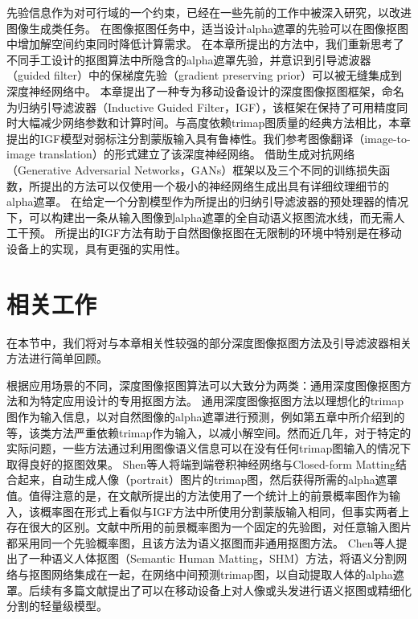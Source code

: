 先验信息作为对可行域的一个约束，已经在一些先前的工作中被深入研究，以改进图像生成类任务\cite{ulyanov2018deep}。
在图像抠图任务中，适当设计alpha遮罩的先验可以在图像抠图中增加解空间约束同时降低计算需求。
在本章所提出的方法中，我们重新思考了不同手工设计的抠图算法中所隐含的alpha遮罩先验，并意识到引导滤波器（guided filter）\cite{he2010guided}中的保梯度先验（gradient preserving prior）可以被无缝集成到深度神经网络中。
本章提出了一种专为移动设备设计的深度图像抠图框架，命名为归纳引导滤波器（Inductive Guided Filter，IGF），该框架在保持了可用精度同时大幅减少网络参数和计算时间。与高度依赖trimap图质量的经典方法相比，本章提出的IGF模型对弱标注分割蒙版输入具有鲁棒性。我们参考图像翻译（image-to-image translation）的形式建立了该深度神经网络。
借助生成对抗网络（Generative Adversarial Networks，GANs）框架以及三个不同的训练损失函数，所提出的方法可以仅使用一个极小的神经网络生成出具有详细纹理细节的alpha遮罩。
在给定一个分割模型作为所提出的归纳引导滤波器的预处理器的情况下，可以构建出一条从输入图像到alpha遮罩的全自动语义抠图流水线，而无需人工干预。
所提出的IGF方法有助于自然图像抠图在无限制的环境中特别是在移动设备上的实现，具有更强的实用性。

\section{相关工作}
在本节中，我们将对与本章相关性较强的部分深度图像抠图方法及引导滤波器相关方法进行简单回顾。

根据应用场景的不同，深度图像抠图算法可以大致分为两类：通用深度图像抠图方法和为特定应用设计的专用抠图方法。
通用深度图像抠图方法以理想化的trimap图作为输入信息，以对自然图像的alpha遮罩进行预测，例如第五章中所介绍到的\parencite{cho2019deep,xu2017deep,lutz2018alphagan,cai2019disentangled,lu2019indices,hou2019context,samplenet}等，该类方法严重依赖trimap作为输入，以减小解空间。然而近几年，对于特定的实际问题，一些方法通过利用图像语义信息可以在没有任何trimap图输入的情况下取得良好的抠图效果。
Shen等人\cite{shen2016deep}将端到端卷积神经网络与Closed-form Matting\cite{levin2008closed}结合起来，自动生成人像（portrait）图片的trimap图，然后获得所需的alpha遮罩值。值得注意的是，在文献\parencite{shen2016deep}所提出的方法使用了一个统计上的前景概率图作为输入，该概率图在形式上看似与IGF方法中所使用分割蒙版输入相同，但事实两者上存在很大的区别。文献\parencite{shen2016deep}中所用的前景概率图为一个固定的先验图，对任意输入图片都采用同一个先验概率图，且该方法为语义抠图而非通用抠图方法。
Chen等人\cite{chen2018semantic}提出了一种语义人体抠图（Semantic Human Matting，SHM）方法，将语义分割网络与抠图网络集成在一起，在网络中间预测trimap图，以自动提取人体的alpha遮罩。后续有多篇文献\cite{zhu2017fast,levinshtein2018real,chen2019boundary}提出了可以在移动设备上对人像或头发进行语义抠图或精细化分割的轻量级模型。

